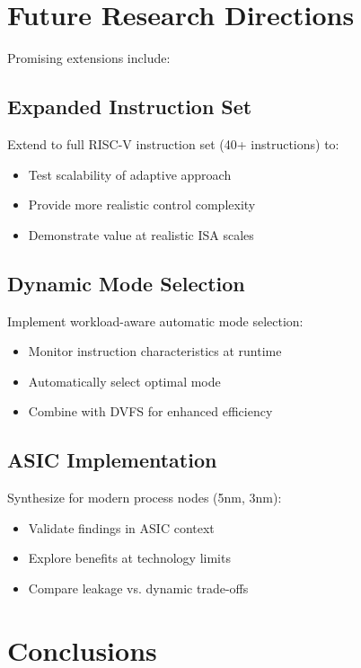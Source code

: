 \documentclass[15pt,a4paper]{report}
\begin{document}
\section{Future Research Directions}

Promising extensions include:

\subsection{Expanded Instruction Set}

Extend to full RISC-V instruction set (40+ instructions) to:
\begin{itemize}
    \item Test scalability of adaptive approach
    \item Provide more realistic control complexity
    \item Demonstrate value at realistic ISA scales
\end{itemize}

\subsection{Dynamic Mode Selection}

Implement workload-aware automatic mode selection:
\begin{itemize}
    \item Monitor instruction characteristics at runtime
    \item Automatically select optimal mode
    \item Combine with DVFS for enhanced efficiency
\end{itemize}

\subsection{ASIC Implementation}

Synthesize for modern process nodes (5nm, 3nm):
\begin{itemize}
    \item Validate findings in ASIC context
    \item Explore benefits at technology limits
    \item Compare leakage vs. dynamic trade-offs
\end{itemize}

\section{Conclusions}
\end{document}
